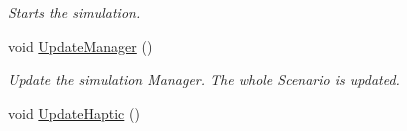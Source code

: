 \begin{DoxyCompactItemize}
\begin{DoxyCompactList}\small\item\em Starts the simulation. \item\end{DoxyCompactList}\item 
\hypertarget{classvtkSimulation_a5e937f6a563eb3c6334489ed2170992d}{
void \hyperlink{classvtkSimulation_a5e937f6a563eb3c6334489ed2170992d}{UpdateManager} ()}
\label{classvtkSimulation_a5e937f6a563eb3c6334489ed2170992d}

\begin{DoxyCompactList}\small\item\em Update the simulation Manager. The whole Scenario is updated. \item\end{DoxyCompactList}\item 
\hypertarget{classvtkSimulation_ad06d10364d93a8c7743129232de29133}{
void \hyperlink{classvtkSimulation_ad06d10364d93a8c7743129232de29133}{UpdateHaptic} ()}
\label{classvtkSimulation_ad06d10364d93a8c7743129232de29133}


\end{DoxyCompactItemize}
